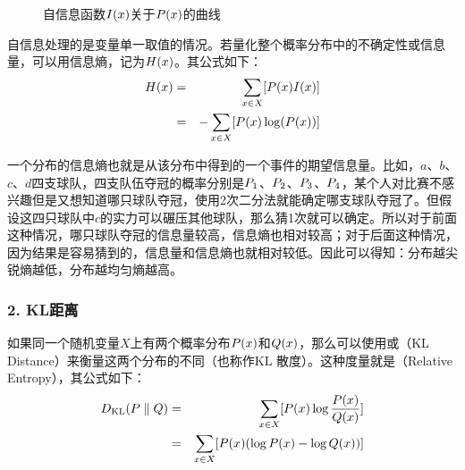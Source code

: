 \begin{figure}[htp]
\centering

\caption{自信息函数${I}(x)$关于${P}(x)$的曲线}
\label{fig:2-3}
\end{figure}

\parinterval 自信息处理的是变量单一取值的情况。若量化整个概率分布中的不确定性或信息量，可以用信息熵，记为${H}(x)$。其公式如下：
\begin{eqnarray}
{H}(x) & = & \sum_{x \in X}[ {P}(x) {I}(x)] \nonumber \\
              & = & - \sum_{x \in X } [{P}(x)\log({P}(x)) ]
\label{eq:2-14}
\end{eqnarray}

\parinterval 一个分布的信息熵也就是从该分布中得到的一个事件的期望信息量。比如，$a$、$b$、$c$、$d$四支球队，四支队伍夺冠的概率分别是${P}_1$、${P}_2$、${P}_3$、${P}_4$，某个人对比赛不感兴趣但是又想知道哪只球队夺冠，使用2次二分法就能确定哪支球队夺冠了。但假设这四只球队中$c$的实力可以碾压其他球队，那么猜1次就可以确定。所以对于前面这种情况，哪只球队夺冠的信息量较高，信息熵也相对较高；对于后面这种情况，因为结果是容易猜到的，信息量和信息熵也就相对较低。因此可以得知：分布越尖锐熵越低，分布越均匀熵越高。


\subsubsection{2. KL距离}

\parinterval 如果同一个随机变量$X$上有两个概率分布${P}(x)$和${Q}(x)$，那么可以使用{\small{}}或{\small{}}（KL Distance）来衡量这两个分布的不同（也称作KL 散度）。这种度量就是{\small{}}（Relative Entropy），其公式如下：
\begin{eqnarray}
{D}_{\textrm{KL}}({P}\parallel {Q}) & = & \sum_{x \in X} [ {P}(x)\log \frac{{P}(x) }{ {Q}(x) } ]  \nonumber \\
                                                                                       & = & \sum_{x \in X }[ {P}(x)(\log {P}(x)-\log {Q}(x))]
\label{eq:2-15}
\end{eqnarray}


